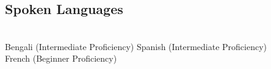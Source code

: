 \documentclass[]{deedy-resume-openfont}
\begin{document}
\begin{minipage}[t]{0.31\textwidth}
\subsection{Spoken Languages}
\\[1\baselineskip]
Bengali (Intermediate Proficiency)
Spanish (Intermediate Proficiency) \\
French (Beginner Proficiency)\\


%
%

\end{minipage}
\hfill
\end{document}
